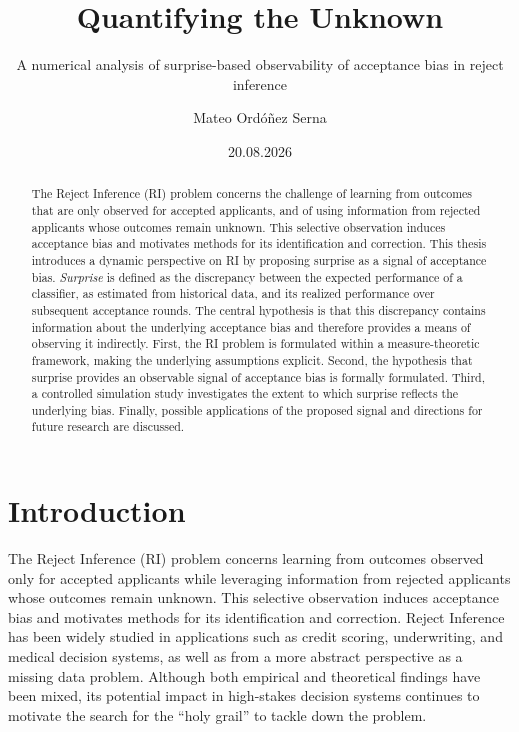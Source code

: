 \documentclass[
  12pt,
]{article}
\title{Quantifying the Unknown}
\subtitle{A numerical analysis of surprise-based observability of
acceptance bias in reject inference}
\author{Mateo Ordóñez Serna}
\date{20.08.2026}
\renewcommand*\contentsname{Table of contents}
\newcommand\contentsname{Table of contents}
\begin{document}
\maketitle
\begin{abstract}
The Reject Inference (RI) problem concerns the challenge of learning
from outcomes that are only observed for accepted applicants, and of
using information from rejected applicants whose outcomes remain
unknown. This selective observation induces acceptance bias and
motivates methods for its identification and correction. This thesis
introduces a dynamic perspective on RI by proposing surprise as a signal
of acceptance bias. \emph{Surprise} is defined as the discrepancy
between the expected performance of a classifier, as estimated from
historical data, and its realized performance over subsequent acceptance
rounds. The central hypothesis is that this discrepancy contains
information about the underlying acceptance bias and therefore provides
a means of observing it indirectly. First, the RI problem is formulated
within a measure-theoretic framework, making the underlying assumptions
explicit. Second, the hypothesis that surprise provides an observable
signal of acceptance bias is formally formulated. Third, a controlled
simulation study investigates the extent to which surprise reflects the
underlying bias. Finally, possible applications of the proposed signal
and directions for future research are discussed.
\end{abstract}

\renewcommand*\contentsname{Table of contents}
{
\setcounter{tocdepth}{3}
\tableofcontents
}

\newpage{}

\section{Introduction}\label{introduction}

The Reject Inference (RI) problem concerns learning from outcomes
observed only for accepted applicants while leveraging information from
rejected applicants whose outcomes remain unknown. This selective
observation induces acceptance bias and motivates methods for its
identification and correction. Reject Inference has been widely studied
in applications such as credit scoring, underwriting, and medical
decision systems, as well as from a more abstract perspective as a
missing data problem. Although both empirical and theoretical findings
have been mixed, its potential impact in high-stakes decision systems
continues to motivate the search for the ``holy grail'' to tackle down
the problem.
\end{document}
